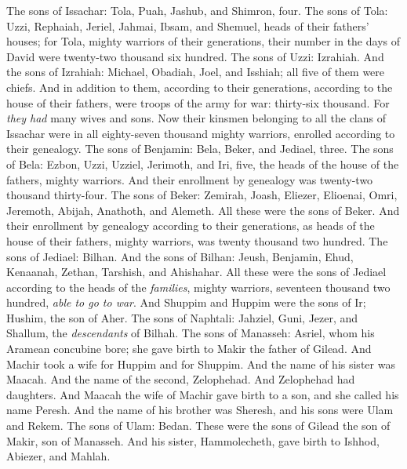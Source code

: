 \begin{biblechapter} %
 The sons of Issachar: Tola, Puah, Jashub, and Shimron, four.
\verse The sons of Tola: Uzzi, Rephaiah, Jeriel, Jahmai, Ibsam, and Shemuel, heads of their fathers’ houses; for Tola, mighty warriors of their generations, their number in the days of David were twenty-two thousand six hundred.
\verse The sons of Uzzi: Izrahiah. And the sons of Izrahiah: Michael, Obadiah, Joel, and Isshiah; all five of them were chiefs.
\verse And in addition to them, according to their generations, according to the house of their fathers, were troops of the army for war: thirty-six thousand. For \textit{they had} many wives and sons.
\verse Now their kinsmen belonging to all the clans of Issachar were in all eighty-seven thousand mighty warriors, enrolled according to their genealogy.
 The sons of Benjamin: Bela, Beker, and Jediael, three.
\verse The sons of Bela: Ezbon, Uzzi, Uzziel, Jerimoth, and Iri, five, the heads of the house of the fathers, mighty warriors. And their enrollment by genealogy was twenty-two thousand thirty-four.
\verse The sons of Beker: Zemirah, Joash, Eliezer, Elioenai, Omri, Jeremoth, Abijah, Anathoth, and Alemeth. All these were the sons of Beker.
\verse And their enrollment by genealogy according to their generations, as heads of the house of their fathers, mighty warriors, was twenty thousand two hundred.
\verse The sons of Jediael: Bilhan. And the sons of Bilhan: Jeush, Benjamin, Ehud, Kenaanah, Zethan, Tarshish, and Ahishahar.
\verse All these were the sons of Jediael according to the heads of the \textit{families}, mighty warriors, seventeen thousand two hundred, \textit{able to go to war}.
\verse And Shuppim and Huppim were the sons of Ir; Hushim, the son of Aher.
 The sons of Naphtali: Jahziel, Guni, Jezer, and Shallum, the \textit{descendants} of Bilhah.
 The sons of Manasseh: Asriel, whom his Aramean concubine bore; she gave birth to Makir the father of Gilead.
\verse And Machir took a wife for Huppim and for Shuppim. And the name of his sister was Maacah. And the name of the second, Zelophehad. And Zelophehad had daughters.
\verse And Maacah the wife of Machir gave birth to a son, and she called his name Peresh. And the name of his brother was Sheresh, and his sons were Ulam and Rekem.
\verse The sons of Ulam: Bedan. These were the sons of Gilead the son of Makir, son of Manasseh.
\verse And his sister, Hammolecheth, gave birth to Ishhod, Abiezer, and Mahlah.

\end{biblechapter}
